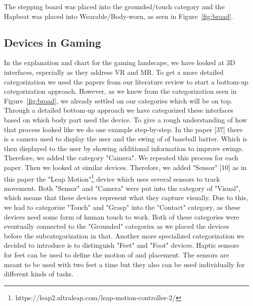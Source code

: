 The stepping board was placed into the grounded/touch category and the Hapbeat was placed into Wearable/Body-worn, as seen in Figure~\ref{fig:broad}.


\subsection{Devices in Gaming}
\label{gaming}
In the explanation and chart for the gaming landscape, we have looked at 3D interfaces, especially as they address VR and MR. To get a more detailed categorization we used the papers from our literature review to start a bottom-up categorization approach. However, as we knew from the categorization seen in Figure~\ref{fig:broad}, we already settled on our categories which will be on top. Through a detailed bottom-up approach we have categorized these interfaces based on which body part used the device. To give a rough understanding of how that process looked like we do one example step-by-step. In the paper [37] there is a camera used to display the user and the swing of of baseball batter. Which is then displayed to the user by showing additional information to improve swings. Therefore, we added the category "Camera". We repeated this process for each paper. Then we looked at similar devices. Therefore, we added "Sensor" [10] as in this paper the "Leap Motion"\footnote{https://leap2.ultraleap.com/leap-motion-controller-2/} device which uses several sensors to track movement. Both "Sensor" and "Camera" were put into the category of "Visual", which means that these devices represent what they capture visually. Due to this, we had to categorize "Touch" and "Grasp" into the "Contact" category, as these devices need some form of human touch to work. Both of these categories were eventually connected to the "Grounded" categories as we placed the devices before the subcategorization in that. Another more specialized categorization we decided to introduce is to distinguish "Feet" and "Foot" devices. Haptic sensors for feet can be used to define the motion of and placement. The sensors are meant to be used with two feet a time but they also can be used individually for different kinds of tasks.


